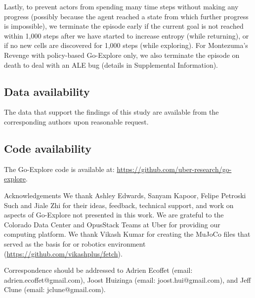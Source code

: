 \documentclass{nature}
\begin{document}
\begin{methods}
Lastly, to prevent actors from spending many time steps without making any progress (possibly because the agent reached a state from which further progress is impossible), we terminate the episode early if the current goal is not reached within 1,000 steps after we have started to increase entropy (while returning), or if no new cells are discovered for 1,000 steps (while exploring). 
For Montezuma's Revenge with policy-based Go-Explore only, we also terminate the episode on death to deal with an ALE bug (details in Supplemental Information).

\subsection{Data availability} The data that support the findings of this study are available from the corresponding authors upon reasonable request.

\subsection{Code availability} The Go-Explore code is available at: \href{https://github.com/uber-research/go-explore}{https://github.com/uber-research/go-explore}.

\printbibliography[segment=2,check=onlynew]

\end{methods}




\begin{addendum}
\item[Acknowledgements]
We thank Ashley Edwards, Sanyam Kapoor, Felipe Petroski Such and Jiale Zhi for their ideas, feedback, technical support, and work on aspects of Go-Explore not presented in this work. We are grateful to the Colorado Data Center and OpusStack Teams at Uber for providing our computing platform. We thank Vikash Kumar for creating the MuJoCo files that served as the basis for or robotics environment  (\href{https://github.com/vikashplus/fetch}{https://github.com/vikashplus/fetch}).
\ifarxiv
\else

\fi


\item[Correspondence] should be addressed to Adrien Ecoffet (email: adrien.ecoffet@gmail.com), Joost Huizinga (email: joost.hui@gmail.com), and Jeff Clune (email: jclune@gmail.com).
\end{addendum}

\newpage
\end{document}
